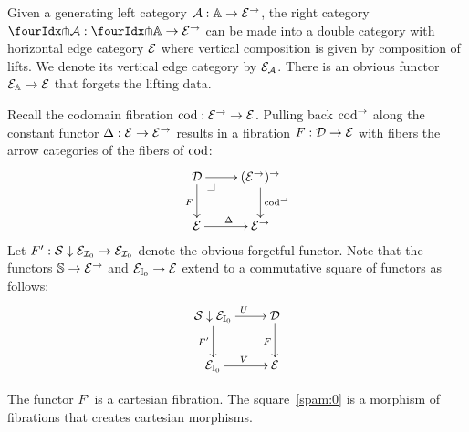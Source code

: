 \documentclass[reqno,10pt,a4paper,oneside]{amsart}
\begin{document}
Given a generating left category $\mathcal{A} : \mathbb{A} \to \mathcal{E}^{\to}$, the right category $\liftr{\cal{A}} : \liftr{\cat{A}} \to \catE^{\to}$ can be made into a double category with horizontal edge category $\mathcal{E}$ where vertical composition is given by composition of lifts.
We denote its vertical edge category by $\mathcal{E}_{\mathcal{A}}$.
There is an obvious functor $\mathcal{E}_{\mathbb{A}} \to \mathcal{E}$ that forgets the lifting data.


Recall the codomain fibration $\operatorname{cod} : \mathcal{E}^{\to} \to \mathcal{E}$.
Pulling back $\operatorname{cod}^{\to}$ along the constant functor $\Delta : \mathcal{E} \to \mathcal{E}^{\to}$ results in a fibration $F : \mathcal{D} \to \mathcal{E}$ with fibers the arrow categories of the fibers of $\operatorname{cod}$:
\[
\xymatrix{
  \cal{D}
  \ar[r]
  \ar[d]_{F}
  \pullback{dr}
&
  (\catE^{\to})^{\to}
  \ar[d]^{\cod^{\to}}
\\
  \catE
  \ar[r]^{\Delta}
&
  \catE^{\to}
}
\]
Let $F' : \mathcal{S} \downarrow \mathcal{E}_{\mathcal{I}_0} \to \mathcal{E}_{\mathcal{I}_0}$ denote the obvious forgetful functor.
Note that the functors $\mathbb{S} \to \mathcal{E}^{\to}$ and $\mathcal{E}_{\mathbb{I}_0} \to \mathcal{E}$ extend to a commutative square of functors as follows:
\begin{equation}
\label{spam:0}
\begin{gathered}
\xymatrix{
  \cal{S} \downarrow \catE_{\cat{I}_0}
  \ar[r]^{U}
  \ar[d]_{F'}
&
  \cal{D}
  \ar[d]_{F}
\\
  \catE_{\cat{I}_0}
  \ar[r]^{V}
&
  \catE
}
\end{gathered}
\end{equation}

\begin{lemma}
The functor $F'$ is a cartesian fibration.
The square~\eqref{spam:0} is a morphism of fibrations that creates cartesian morphisms.
\end{lemma}
\end{document}
